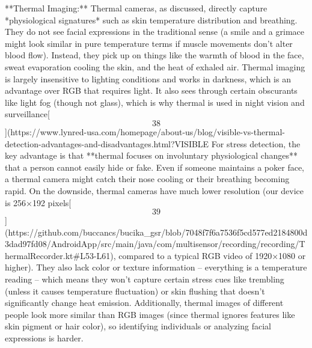 \documentclass[12pt,a4paper]{article}
\begin{document}
**Thermal Imaging:** Thermal cameras, as discussed, directly capture
*physiological signatures* such as skin temperature distribution and
breathing. They do not see facial expressions in the traditional sense
(a smile and a grimace might look similar in pure temperature terms if
muscle movements don't alter blood flow). Instead, they pick up on
things like the warmth of blood in the face, sweat evaporation cooling
the skin, and the heat of exhaled air. Thermal imaging is largely
insensitive to lighting conditions and works in darkness, which is an
advantage over RGB that requires light. It also sees through certain
obscurants like light fog (though not glass), which is why thermal is
used in night vision and
surveillance[\[38\]](https://www.lynred-usa.com/homepage/about-us/blog/visible-vs-thermal-detection-advantages-and-disadvantages.html?VISIBLE%
For stress detection, the key advantage is that **thermal focuses on
involuntary physiological changes** that a person cannot easily hide or
fake. Even if someone maintains a poker face, a thermal camera might
catch their nose cooling or their breathing becoming rapid. On the
downside, thermal cameras have much lower resolution (our device is
256×192
pixels[\[39\]](https://github.com/buccancs/bucika_gsr/blob/7048f7f6a7536f5cd577ed2184800d3dad97fd08/AndroidApp/src/main/java/com/multisensor/recording/recording/ThermalRecorder.kt#L53-L61),
compared to a typical RGB video of 1920×1080 or higher). They also lack
color or texture information -- everything is a temperature reading --
which means they won't capture certain stress cues like trembling
(unless it causes temperature fluctuation) or skin flushing that doesn't
significantly change heat emission. Additionally, thermal images of
different people look more similar than RGB images (since thermal
ignores features like skin pigment or hair color), so identifying
individuals or analyzing facial expressions is harder.
\end{document}
